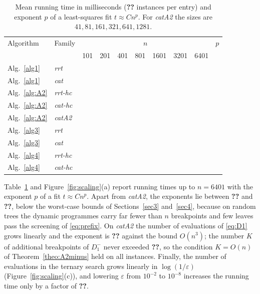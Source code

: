 \begin{table}[htbp]
\centering
\small
\caption{Mean running time in milliseconds (\textbf{??} instances per entry) %
and exponent $p$ of a least-squares fit $t\approx Cn^{p}$. For \emph{catA2}
the sizes are $41,81,161,321,641,1281$.}
\label{tab:runtimes}
\begin{tabular}{ll rrrrrrr r}
\hline
Algorithm & Family & \multicolumn{7}{c}{$n$} & $p$ \\
& & 101 & 201 & 401 & 801 & 1601 & 3201 & 6401 & \\
\hline
Alg.~\ref{alg1}  & \emph{rrt}    & & & & & & & & \\
Alg.~\ref{alg1}  & \emph{cat}    & & & & & & & & \\
Alg.~\ref{alg:A2} & \emph{rrt-hc} & & & & & & & & \\
Alg.~\ref{alg:A2} & \emph{cat-hc} & & & & & & & & \\
Alg.~\ref{alg:A2} & \emph{catA2}  & & & & & & & & \\
Alg.~\ref{alg3}  & \emph{rrt}    & & & & & & & & \\
Alg.~\ref{alg3}  & \emph{cat}    & & & & & & & & \\
Alg.~\ref{alg4}  & \emph{rrt-hc} & & & & & & & & \\
Alg.~\ref{alg4}  & \emph{cat-hc} & & & & & & & & \\
\hline
\end{tabular}
\end{table}

Table~\ref{tab:runtimes} and Figure~\ref{fig:scaling}(a) report running times
up to $n=6401$ with the exponent $p$ of a fit $t\approx Cn^{p}$. Apart from
\emph{catA2}, the exponents lie between \textbf{??} and \textbf{??}, %
below the worst-case bounds of Sections~\ref{sec3} and~\ref{sec4}, because on
random trees the dynamic programmes carry far fewer than $n$ breakpoints and
few leaves pass the screening of \eqref{eq:prefix}. On \emph{catA2} the
number of evaluations of \eqref{eq:D1} grows linearly and the exponent is
\textbf{??} against the bound $O(n^3)$; %
the number $K$ of additional breakpoints of $D_1^-$ never exceeded
\textbf{??}, %
so the condition $K=O(n)$ of Theorem~\ref{theo:A2minus} held on all
instances. Finally, the number of evaluations in the ternary search grows
linearly in $\log(1/\varepsilon)$ (Figure~\ref{fig:scaling}(c)), and lowering
$\varepsilon$ from $10^{-2}$ to $10^{-8}$ increases the running time only by a
factor of \textbf{??}. %
